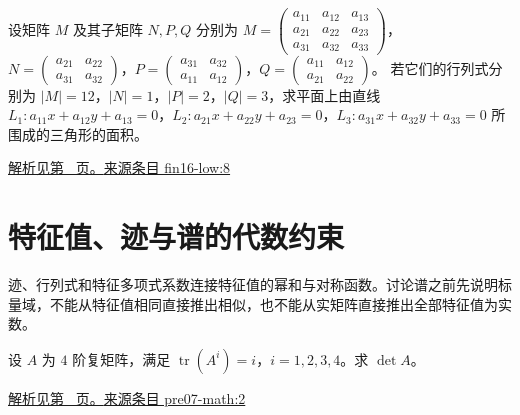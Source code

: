 \documentclass[UTF8,12pt,a4paper,fontset=fandol]{ctexart}
\begin{document}
\begin{example}\label{ex:fin16-low:8}

设矩阵 $M$ 及其子矩阵 $N,P,Q$ 分别为
$M = \begin{pmatrix} a_{11} & a_{12} & a_{13} \\ a_{21} & a_{22} & a_{23} \\ a_{31} & a_{32} & a_{33} \end{pmatrix}$，$N = \begin{pmatrix} a_{21} & a_{22} \\ a_{31} & a_{32} \end{pmatrix}$，$P = \begin{pmatrix} a_{31} & a_{32} \\ a_{11} & a_{12} \end{pmatrix}$，$Q = \begin{pmatrix} a_{11} & a_{12} \\ a_{21} & a_{22} \end{pmatrix}$。
若它们的行列式分别为 $|M| = 12$，$|N| = 1$，$|P| = 2$，$|Q| = 3$，求平面上由直线 $L_1: a_{11}x + a_{12}y + a_{13} = 0$，$L_2: a_{21}x + a_{22}y + a_{23} = 0$，$L_3: a_{31}x + a_{32}y + a_{33} = 0$ 所围成的三角形的面积。

\par\hyperref[ans:fin16-low:8]{解析见第~\pageref{ans:fin16-low:8} 页。}\quad\href{https://github.com/lzxcr/cmc-mathematics/blob/64916fa1fdbc3e444a652eca204d5669058ee321/src/problems/finals/16/08.md}{来源条目 fin16-low:8}

\end{example}

\section{特征值、迹与谱的代数约束}

\label{sec:questions-3}

迹、行列式和特征多项式系数连接特征值的幂和与对称函数。讨论谱之前先说明标量域，不能从特征值相同直接推出相似，也不能从实矩阵直接推出全部特征值为实数。

\begin{example}\label{ex:pre07-math:2}

设 $A$ 为 $4$ 阶复矩阵，满足 $\operatorname{tr}(A^i)=i$，$i=1,2,3,4$。求 $\det A$。

\par\hyperref[ans:pre07-math:2]{解析见第~\pageref{ans:pre07-math:2} 页。}\quad\href{https://github.com/lzxcr/cmc-mathematics/blob/64916fa1fdbc3e444a652eca204d5669058ee321/src/problems/preliminary/07/02.md}{来源条目 pre07-math:2}

\end{example}
\end{document}
